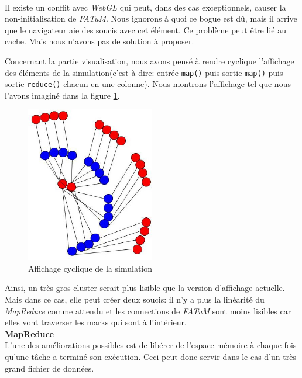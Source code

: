 \paragraph{}
Il existe un conflit avec {\it WebGL} qui peut, dans des cas exceptionnels, causer la non-initialisation de {\it FATuM}. Nous ignorons à quoi ce bogue est dû, mais il arrive que le navigateur aie des soucis avec cet élément. Ce problème peut être lié au cache. Mais nous n'avons pas de solution à proposer.

Concernant la partie visualisation, nous avons pensé à rendre cyclique l'affichage des éléments de la simulation(c'est-à-dire: entrée {\tt map()} puis sortie {\tt map()} puis sortie {\tt reduce()} chacun en une colonne). Nous montrons l'affichage tel que nous l'avons imaginé dans la figure \ref{fig:possibilite}.

\begin{figure}[H]
  \centering
    \includegraphics[width=0.5\textwidth]{images/cyclique.jpg}
        \caption{Affichage cyclique de la simulation}
        \label{fig:possibilite}
\end{figure}
Ainsi, un très gros cluster serait plus lisible que la version d'affichage actuelle. Mais dans ce cas, elle peut créer deux soucis: il n'y a plus la linéarité du {\it MapReduce} comme attendu et les connections de {\it FATuM} sont moins lisibles car elles vont traverser les marks qui sont à l'intérieur.\\

{\bf MapReduce}\\

L'une des améliorations possibles est de libérer de l'espace mémoire à chaque fois qu'une tâche a terminé son exécution. Ceci peut donc servir dans le cas d'un très grand fichier de données.\\

